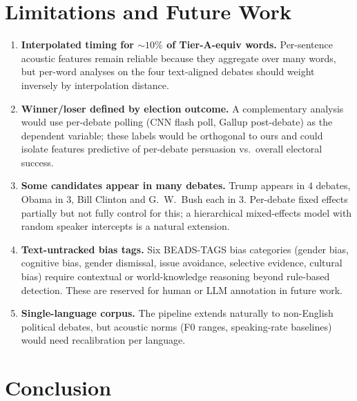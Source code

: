 \documentclass[journal]{IEEEtran}
\begin{document}
\section{Limitations and Future Work}
\label{sec:limitations}

\begin{enumerate}
  \item \textbf{Interpolated timing for $\sim 10\%$ of Tier-A-equiv
        words.} Per-sentence acoustic features remain reliable because
        they aggregate over many words, but per-word analyses on the
        four text-aligned debates should weight inversely by
        interpolation distance.
  \item \textbf{Winner/loser defined by election outcome.} A complementary
        analysis would use per-debate polling (CNN flash poll, Gallup
        post-debate) as the dependent variable; these labels would be
        orthogonal to ours and could isolate features predictive of
        per-debate persuasion vs.\ overall electoral success.
  \item \textbf{Some candidates appear in many debates.} Trump appears
        in $4$ debates, Obama in $3$, Bill Clinton and G.\ W.\ Bush
        each in $3$. Per-debate fixed effects partially but not fully
        control for this; a hierarchical mixed-effects model with
        random speaker intercepts is a natural extension.
  \item \textbf{Text-untracked bias tags.} Six BEADS-TAGS bias
        categories (gender bias, cognitive bias, gender dismissal,
        issue avoidance, selective evidence, cultural bias) require
        contextual or world-knowledge reasoning beyond rule-based
        detection. These are reserved for human or LLM annotation in
        future work.
  \item \textbf{Single-language corpus.} The pipeline extends naturally to
        non-English political debates, but acoustic norms (F0 ranges,
        speaking-rate baselines) would need recalibration per language.
\end{enumerate}

\section{Conclusion}
\label{sec:conclusion}
\end{document}
